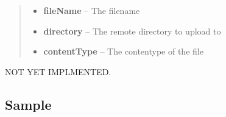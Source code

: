 \documentclass[letterpaper,10pt,english]{sphinxmanual}
\begin{document}
\begin{fulllineitems}
\begin{fulllineitems}
\begin{quote}
\begin{description}
\begin{itemize}
\item {} 
\textbf{fileName} -- The filename

\item {} 
\textbf{directory} -- The remote directory to upload to

\item {} 
\textbf{contentType} -- The contentype of the file

\end{itemize}

\end{description}\end{quote}

\end{fulllineitems}


\begin{fulllineitems}
\label{Available modules:BaseSpacePy.model.Analysis.Analysis.uploadMultipartFile}
NOT YET IMPLMENTED.

\end{fulllineitems}


\end{fulllineitems}



\subsection{Sample}
\label{Available modules:sample}
\end{document}
